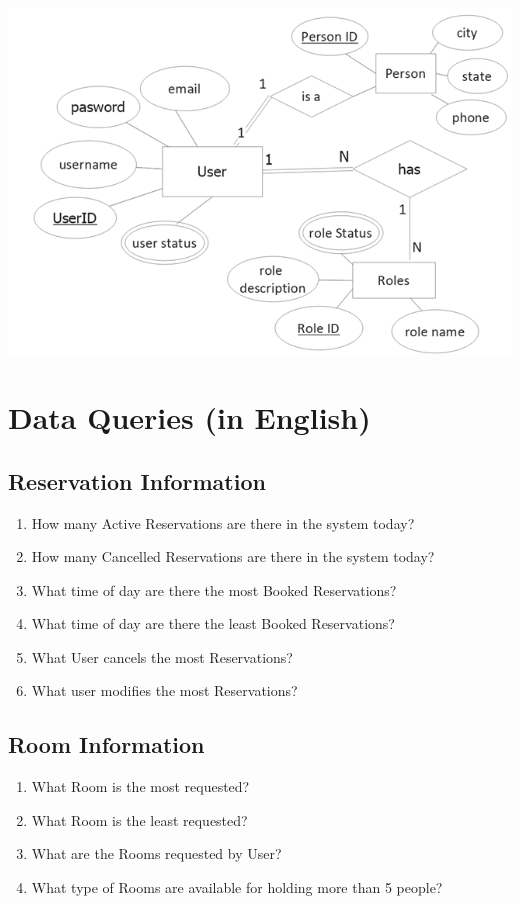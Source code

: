 \documentclass[11pt]{report}
\begin{document}
\begin{center}
\includegraphics{user_has_role.PNG}
\end{center}
 
 

\section*{Data Queries (in English)}
\subsection*{Reservation Information}
\begin{enumerate}
\item How many Active Reservations are there in the system today?
\item How many Cancelled Reservations are there in the system today?
\item What time of day are there the most Booked Reservations?
\item What time of day are there the least Booked Reservations?
\item What User cancels the most Reservations?
\item What user modifies the most Reservations?
\end{enumerate}

\subsection*{Room Information}
\begin{enumerate}
\item What Room is the most requested?
\item What Room is the least requested?
\item What are the Rooms requested by User?
\item What type of Rooms are available for holding more than 5 people?
\end{enumerate}
\end{document}
